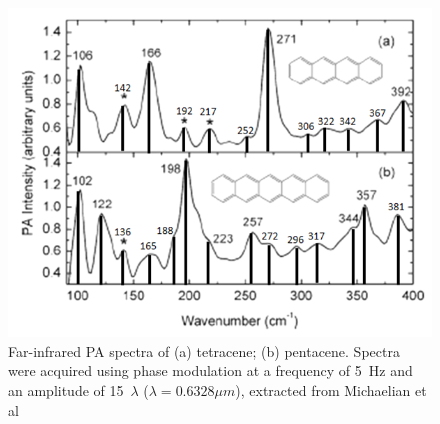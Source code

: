 \begin{figure}[htb]
	\centering
	\includegraphics[scale=0.8]{image/spectra-TP}
	\caption[Far-infrared PA spectra of (a) tetracene; (b) pentacene]{Far-infrared PA spectra of (a) tetracene; (b) pentacene. Spectra were acquired using phase modulation at a frequency of 5 Hz and an amplitude of 15 $\lambda$ ($\lambda = 0.6328 \mu m$), extracted from Michaelian et al \cite{michaelian2012far} } \label{spectra-TP}
\end{figure}

